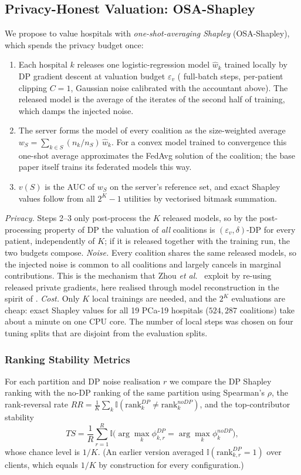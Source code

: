 \documentclass[journal]{IEEEtran}
\begin{document}
\subsection{Privacy-Honest Valuation: OSA-Shapley}
\label{sec:osa}
We propose to value hospitals with \emph{one-shot-averaging Shapley} (OSA-Shapley), which spends the privacy budget once:
\begin{enumerate}
\item Each hospital $k$ releases one logistic-regression model $\hat w_k$ trained locally by DP gradient descent at valuation budget $\varepsilon_v$ (\osaSteps{} full-batch steps, per-patient clipping $C=1$, Gaussian noise calibrated with the accountant above). The released model is the average of the iterates of the second half of training, which damps the injected noise.
\item The server forms the model of every coalition as the size-weighted average $w_S = \sum_{k\in S} (n_k/n_S)\,\hat w_k$. For a convex model trained to convergence this one-shot average approximates the FedAvg solution of the coalition; the base paper itself trains its federated models this way.
\item $v(S)$ is the AUC of $w_S$ on the server's reference set, and exact Shapley values follow from all $2^K-1$ utilities by vectorised bitmask summation.
\end{enumerate}
\emph{Privacy.} Steps 2--3 only post-process the $K$ released models, so by the post-processing property of DP the valuation of \emph{all} coalitions is $(\varepsilon_v,\delta)$-DP for every patient, independently of $K$; if it is released together with the training run, the two budgets compose. \emph{Noise.} Every coalition shares the same released models, so the injected noise is common to all coalitions and largely cancels in marginal contributions. This is the mechanism that Zhou \emph{et al.}\ \cite{Zhou2025Data} exploit by re-using released private gradients, here realised through model reconstruction in the spirit of \cite{Song2019BlockchainFL, Wei2020DataValuation, Liu2022GTG}. \emph{Cost.} Only $K$ local trainings are needed, and the $2^K$ evaluations are cheap: exact Shapley values for all 19 PCa-19 hospitals ($524{,}287$ coalitions) take about a minute on one CPU core. The number of local steps was chosen on four tuning splits that are disjoint from the evaluation splits.

\subsubsection{Ranking Stability Metrics}
For each partition and DP noise realisation $r$ we compare the DP Shapley ranking with the no-DP ranking of the same partition using Spearman's $\rho$, the rank-reversal rate $RR = \frac{1}{K}\sum_k \mathbb{I}(\mathrm{rank}^{DP}_k \neq \mathrm{rank}^{noDP}_k)$, and the top-contributor stability
\begin{equation}
TS = \frac{1}{R} \sum_{r=1}^{R} \mathbb{I}\big(\arg\max_k \phi^{DP}_{k,r} = \arg\max_k \phi^{noDP}_{k}\big),
\end{equation}
whose chance level is $1/K$. (An earlier version averaged $\mathbb{I}(\mathrm{rank}^{DP}_{k,r}=1)$ over clients, which equals $1/K$ by construction for every configuration.)
\end{document}
